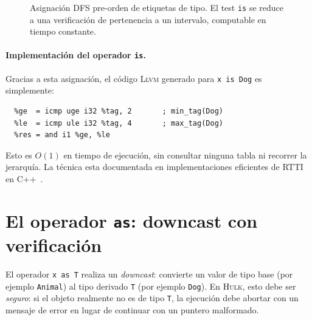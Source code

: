 \documentclass[11pt,a4paper,oneside,openany]{report}
\newcommand{\hulk}{\textsc{Hulk}}
\newcommand{\code}[1]{\texttt{#1}}
\newcommand{\llvm}{\textsc{Llvm}}
\newcommand{\done}{{\color{webgreen}\ding{52}}}
\newcommand{\miss}{{\color{webbrown}\ding{56}}}
\begin{document}
\begin{figure}[H]
\centering
{}
\caption[Asignación DFS de etiquetas]{Asignación DFS pre-orden de etiquetas de
  tipo. El test \code{is} se reduce a una verificación de pertenencia a un
  intervalo, computable en tiempo constante.}
\label{fig:dfs-tags}
\end{figure}

\paragraph{Implementación del operador \code{is}.}
Gracias a esta asignación, el código \llvm{} generado para \code{x is Dog} es
simplemente:

\begin{lstlisting}[style=llvmst, numbers=none]
  %tag = load i32, ptr %x
  %ge  = icmp uge i32 %tag, 2       ; min_tag(Dog)
  %le  = icmp ule i32 %tag, 4       ; max_tag(Dog)
  %res = and i1 %ge, %le
\end{lstlisting}

Esto es $O(1)$ en tiempo de ejecución, sin consultar ninguna tabla ni recorrer la
jerarquía. La técnica esta documentada en implementaciones eficientes de RTTI en
C++~\cite{bjarne1994}.

\section{El operador \code{as}: downcast con verificación}

El operador \code{x as T} realiza un \textit{downcast}: convierte un valor de tipo
base (por ejemplo \code{Animal}) al tipo derivado \code{T} (por ejemplo \code{Dog}).
En \hulk{}, esto debe ser \textit{seguro}: si el objeto realmente no es de tipo
\code{T}, la ejecución debe abortar con un mensaje de error en lugar de continuar
con un puntero malformado.
\end{document}
